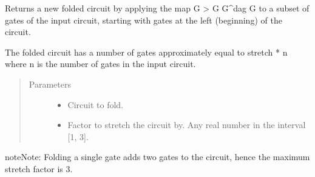 \documentclass[letterpaper,10pt,english]{sphinxmanual}
\begin{document}
\begin{fulllineitems}
\label{\detokenize{apidoc:mitiq.folding_cirq.fold_gates_from_left}}
Returns a new folded circuit by applying the map G \sphinxhyphen{}\textgreater{} G G\textasciicircum{}dag G to a subset of gates of the input circuit,
starting with gates at the left (beginning) of the circuit.

The folded circuit has a number of gates approximately equal to stretch * n where n is the number of gates in
the input circuit.
\begin{quote}\begin{description}
\item[{Parameters}] \leavevmode\begin{itemize}
\item {} 
 \sphinxhyphen{}\sphinxhyphen{} Circuit to fold.

\item {} 
 \sphinxhyphen{}\sphinxhyphen{} Factor to stretch the circuit by. Any real number in the interval {[}1, 3{]}.

\end{itemize}

\end{description}\end{quote}

\begin{sphinxadmonition}{note}{Note:}
Folding a single gate adds two gates to the circuit, hence the maximum stretch factor is 3.
\end{sphinxadmonition}

\end{fulllineitems}

\end{document}
